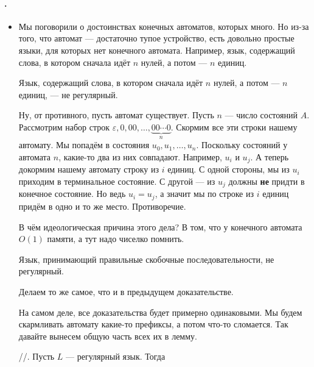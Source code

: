\documentclass{article}
\begin{document}
    \paragraph{.}
    \begin{itemize}
        \item[]
        \begin{Comment}
            Мы поговорили о достоинствах конечных автоматов, которых много. Но из-за того, что автомат --- достаточно тупое устройство, есть довольно простые языки, для которых нет конечного автомата. Например, язык, содержащий слова, в котором сначала идёт $n$ нулей, а потом --- $n$ единиц.
        \end{Comment}
        \thm Язык, содержащий слова, в котором сначала идёт $n$ нулей, а потом --- $n$ единиц, --- не регулярный.
        \begin{Proof}
            Ну, от противного, пусть автомат существует. Пусть $n$ --- число состояний $A$. Рассмотрим набор строк $\varepsilon,\mathrm0,\mathrm{00},\ldots,\underbrace{\mathrm{00}\cdots\mathrm0}_n$. Скормим все эти строки нашему автомату. Мы попадём в состояния $u_0,u_1,\ldots,u_n$. Поскольку состояний у автомата $n$, какие-то два из них совпадают. Например, $u_i$ и $u_j$. А теперь докормим нашему автомату строку из $i$ единиц. С одной стороны, мы из $u_i$ приходим в терминальное состояние. С другой --- из $u_j$ должны \textbf{не} придти в конечное состояние. Но ведь $u_i=u_j$, а значит мы по строке из $i$ единиц придём в одно и то же место. Противоречие.
        \end{Proof}
        \begin{Comment}
            В чём идеологическая причина этого дела? В том, что у конечного автомата $O(1)$ памяти, а тут надо чиселко помнить.
        \end{Comment}
        \thm Язык, принимающий правильные скобочные последовательности, не регулярный.
        \begin{Proof}
            Делаем то же самое, что и в предыдущем доказательстве.
        \end{Proof}
        \begin{Comment}
            На самом деле, все доказательства будет примерно одинаковыми. Мы будем скармливать автомату какие-то префиксы, а потом что-то сломается. Так давайте вынесем общую часть всех их в лемму.
        \end{Comment}
        \thm {}//. Пусть $L$ --- регулярный язык. Тогда

\end{itemize}
\end{document}
